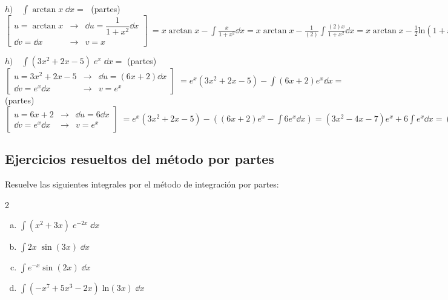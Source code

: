 \begin{ejem}
	
	$h) \quad \displaystyle \int \arctan x \; \dd x= \; $ (partes) $ \left[ \begin{matrix} u=\arctan x  & \to & \dd u = \dfrac {1}{1+x^2} \dd x  \\ \dd v = \dd x & \to & v=x \end{matrix} \right] \; =  \displaystyle x \arctan x - \int \frac {x}{1+x^2} \dd x =  x \arctan x - \frac {1}{(2)} \int \frac {(2)x}{1+x^2} \dd x =x \arctan x - \frac 1 2 \mathrm{ln} (1+x^2) +\mathcal C $
	
	$h) \quad \displaystyle \int (3x^2+2x-5)\; e^x\; \dd x =  $ (partes) $ \left[ \begin{matrix} u=3x^2+2x-5 & \to &  \dd u = (6x+2) \dd x \\ \dd v = e^x \dd x & \to & v=e^x \end{matrix} \right] \; = e^x(3x^2+2x-5)-\int (6x+2)e^x \dd x=  $ (partes) $ \displaystyle \left[ \begin{matrix} u=6x+2 & \to & \dd u= 6 \dd x \\ \dd v = e^x \dd x & \to & v=e^x \end{matrix} \right] \; = e^x(3x^2+2x-5) - \left((6x+2)e^x - \int 6 e^x \dd x  \right)= (3x^2-4x-7)e^x+6\int e^x \dd x= (3x^2-4x-7)e^x+6e^x +\mathcal C= (3x^2-4x-1)\; e^x +\mathcal C$
\end{ejem} 


\subsection{Ejercicios resueltos del método por partes}

\begin{ejre} Resuelve las siguientes integrales por el método de integración por partes:
\begin{multicols}{2}
\begin{enumerate}[a) ]
	\item $\displaystyle \int (x^2+3x)\; e^{-2x} \; \dd x $
	\item $\displaystyle \int 2x\; \sin (3x)  \; \dd x $
	\item $\displaystyle \int e^{-x} \sin (2x)  \; \dd x $
	\item $\displaystyle \int (-x^7+5x^3-2x)\; \mathrm{ln} (3x) \; \dd x $
\end{enumerate}
\end{multicols}	
\end{ejre}

